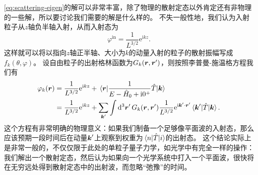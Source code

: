 \documentclass[UTF8, a4paper]{ctexart}
\newcommand*{\ee}{\mathrm{e}}
\newcommand*{\ii}{\mathrm{i}}
\begin{document}
\eqref{eq:scattering-eigen}的解可以非常丰富，除了物理的散射定态以外肯定还有非物理的一些解，所以要讨论我们需要的解是什么样的。
不失一般性地，我们认为入射粒子从$z$轴负半轴入射，从而入射态为
\[
    \varphi^\text{in} = \frac{1}{L^{3/2}} \ee^{\ii k z}.
\]
这样就可以将以指向$z$轴正半轴、大小为$k$的动量入射的粒子的散射振幅写成$f_k(\theta, \varphi)$。
设自由粒子的出射格林函数为$G_k(\vb*{r}, \vb*{r}')$，则按照李普曼-施温格方程我们有
\[
    \begin{aligned}
        \varphi_k(\vb*{r}) &= \frac{1}{L^{3/2}} \ee^{\ii k z} + \mel{\vb*{r}}{\frac{1}{E - \hat{H}_0 + \ii 0^+} \hat{T}}{\vb*{k}} \\
        &= \frac{1}{L^{3/2}} \ee^{\ii k z} + \sum_{\vb*{k}'} \int \dd[3]{\vb*{r}'} G_k(\vb*{r}, \vb*{r}') \frac{1}{L^{3/2}} \ee^{\ii \vb*{k}' \cdot \vb*{r}'} \mel*{\vb*{k}'}{\hat{T}}{\vb*{k}}.
    \end{aligned}
\]
这个方程有非常明确的物理意义：如果我们制备一个足够像平面波的入射态，那么应该预期一段时间后在动量$\vb*{k}'$上观察到权重为$\mel{n}{\hat{T}}{i}$的出射态。
这个结论实际上是非常一般的，不仅仅限于此处的单粒子量子力学，如光学中有完全一样的操作：我们解出一个散射定态，然后认为如果向一个光学系统中打入一个平面波，很快将在无穷远处得到散射定态中的出射波，而忽略“弛豫”的时间。
\end{document}

